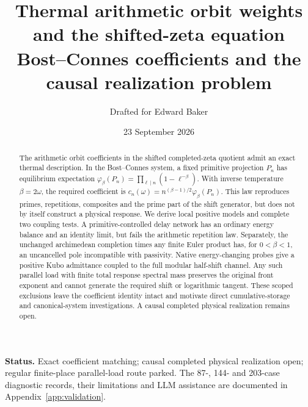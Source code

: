 \documentclass[11pt]{article}
\title{Thermal arithmetic orbit weights\\and the shifted-zeta equation\\[4pt]
\large Bost--Connes coefficients and the causal realization problem}
\author{Drafted for Edward Baker}
\date{23 September 2026}
\begin{document}
\maketitle
\begin{abstract}
The arithmetic orbit coefficients in the shifted completed-zeta quotient
admit an exact thermal description. In the Bost--Connes system, a fixed
primitive projection $P_n$ has equilibrium expectation
$\varphi_\beta(P_n)=\prod_{\ell\mid n}(1-\ell^{-\beta})$.
With inverse temperature $\beta=2\omega$, the required coefficient is
$c_n(\omega)=n^{(\beta-1)/2}\varphi_\beta(P_n)$.
This law reproduces primes, repetitions, composites and the prime part of
the shift generator, but does not by itself construct a physical response.
We derive local positive models and complete two coupling tests.
A primitive-controlled delay network has an ordinary energy balance
and an identity limit, but fails the arithmetic repetition law.
Separately, the unchanged archimedean completion times any finite
Euler product has, for $0<\beta<1$, an uncancelled pole incompatible
with passivity.
Native energy-changing probes give a positive Kubo admittance coupled
to the full modular half-shift channel. Any such parallel load with
finite total response spectral mass preserves the original front
exponent and cannot generate the required shift or logarithmic tangent.
These scoped exclusions leave the coefficient identity intact and
motivate direct cumulative-storage and canonical-system investigations.
A causal completed physical realization remains open.
\end{abstract}
\noindent\textbf{Status.} Exact coefficient matching; causal completed
physical realization open; regular finite-place parallel-load route
parked. The 87-, 144- and 203-case diagnostic records, their limitations
and LLM assistance are documented in Appendix~\ref{app:validation}.
{\small\tableofcontents}
\clearpage








\appendix

\clearpage

\end{document}
